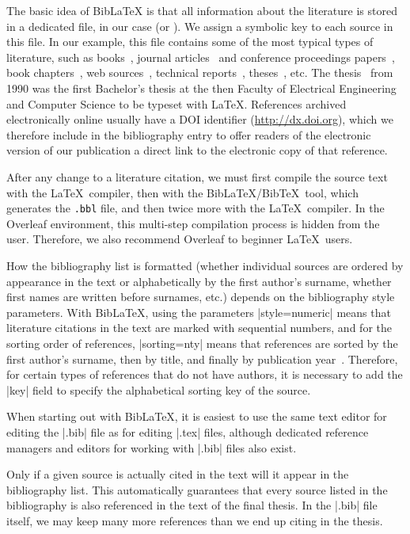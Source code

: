 \documentclass[9pt]{style/friteza}
\begin{document}
The basic idea of Bib\LaTeX{} is that all information about the literature is stored in a dedicated file, in our case  (or ).
We assign a symbolic key to each source in this file.
In our example, this file contains some of the most typical types of literature, such as books~\cite{lamport},
journal articles~\cite{leonardo} and conference proceedings papers~\cite{ciuha2010visualization},
book chapters~\cite{poglavje_springer},
web sources~\cite{slovarji,video},
technical reports~\cite{andersen2012kinect},
theses~\cite{diploma}, etc.
The thesis~\cite{diploma} from 1990 was the first Bachelor's thesis at the then Faculty of Electrical Engineering and Computer Science to be typeset with \LaTeX.
References archived electronically online usually have a DOI identifier (\url{http://dx.doi.org}), which we therefore include in the bibliography entry to offer readers of the electronic version of our publication a direct link to the electronic copy of that reference.

After any change to a literature citation, we must first compile the source text with the \LaTeX\ compiler, then with the Bib\LaTeX/Bib\TeX\ tool, which generates the {\tt .bbl} file, and then twice more with the \LaTeX\ compiler.
In the Overleaf environment, this multi-step compilation process is hidden from the user. Therefore, we also recommend Overleaf to beginner \LaTeX\ users.

How the bibliography list is formatted (whether individual sources are ordered by appearance in the text or alphabetically by the first author's surname, whether first names are written before surnames, etc.) depends on the bibliography style parameters.
With Bib\LaTeX, using the parameters
\ltx|style=numeric| means that literature citations in the text are marked with sequential numbers, and for the sorting order of references,
\ltx|sorting=nty| means that references are sorted by the first author's surname, then by title, and finally by publication year~\cite{ctan}.
Therefore, for certain types of references that do not have authors, it is necessary to add the \ltx|key| field to specify the alphabetical sorting key of the source.

When starting out with Bib\LaTeX, it is easiest to use the same text editor for editing the \ltx|.bib| file as for editing \ltx|.tex| files,
although dedicated reference managers and editors for working with \ltx|.bib| files also exist.

Only if a given source is actually cited in the text will it appear in the bibliography list.
This automatically guarantees that every source listed in the bibliography is also referenced in the text of the final thesis.
In the \ltx|.bib| file itself, we may keep many more references than we end up citing in the thesis.
\end{document}
